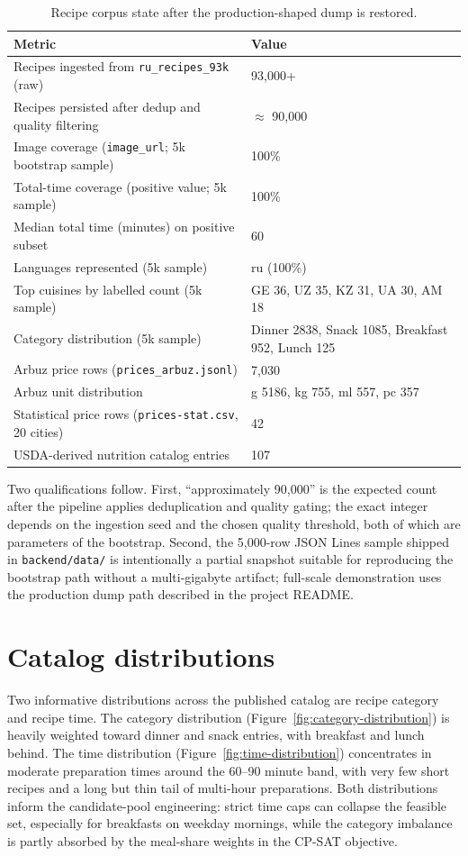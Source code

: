 \begin{table}[H]
\centering
\small
\caption{Recipe corpus state after the production-shaped dump is restored.}
\label{tab:corpus}
\begin{tabular}{|p{8cm}|p{5.5cm}|}
\hline
Metric & Value \\
\hline
Recipes ingested from \texttt{ru\_recipes\_93k} (raw) & 93{,}000+ \\
Recipes persisted after dedup and quality filtering & $\approx$ 90{,}000 \\
Image coverage (\texttt{image\_url}; 5k bootstrap sample) & 100\% \\
Total-time coverage (positive value; 5k sample) & 100\% \\
Median total time (minutes) on positive subset & 60 \\
Languages represented (5k sample) & ru (100\%) \\
Top cuisines by labelled count (5k sample) & GE 36, UZ 35, KZ 31, UA 30, AM 18 \\
Category distribution (5k sample) & Dinner 2838, Snack 1085, Breakfast 952, Lunch 125 \\
Arbuz price rows (\texttt{prices\_arbuz.jsonl}) & 7{,}030 \\
Arbuz unit distribution & g 5186, kg 755, ml 557, pc 357 \\
Statistical price rows (\texttt{prices-stat.csv}, 20 cities) & 42 \\
USDA-derived nutrition catalog entries & 107 \\
\hline
\end{tabular}
\end{table}

Two qualifications follow. First, ``approximately 90{,}000'' is the expected count after the pipeline applies deduplication and quality gating; the exact integer depends on the ingestion seed and the chosen quality threshold, both of which are parameters of the bootstrap. Second, the 5{,}000-row JSON Lines sample shipped in \texttt{backend/data/} is intentionally a partial snapshot suitable for reproducing the bootstrap path without a multi-gigabyte artifact; full-scale demonstration uses the production dump path described in the project README.

\section{Catalog distributions}

Two informative distributions across the published catalog are recipe category and recipe time. The category distribution (Figure~\ref{fig:category-distribution}) is heavily weighted toward dinner and snack entries, with breakfast and lunch behind. The time distribution (Figure~\ref{fig:time-distribution}) concentrates in moderate preparation times around the 60--90 minute band, with very few short recipes and a long but thin tail of multi-hour preparations. Both distributions inform the candidate-pool engineering: strict time caps can collapse the feasible set, especially for breakfasts on weekday mornings, while the category imbalance is partly absorbed by the meal-share weights in the CP-SAT objective.

